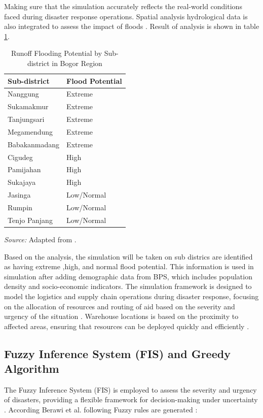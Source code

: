 \documentclass[journal,final,a4paper,twoside,11pt]{IEEEtran}
\begin{document}
Making sure that the simulation accurately reflects the real-world conditions faced during disaster response operations. Spatial analysis hydrological data is also integrated to assess the impact of floods \cite{alkaesi2021spatial}. Result of analysis is shown in table \ref{tab:analysis}.
\begin{table}[htbp]
\caption{Runoff Flooding Potential by Sub-district in Bogor Region}
\begin{center}
\begin{tabular}{|m{2.5cm}|m{2cm}|}
\hline
\textbf{Sub-district} & \textbf{Flood Potential} \\
\hline
Nanggung & Extreme \\
\hline Sukamakmur & Extreme \\
\hline Tanjungsari & Extreme \\
\hline Megamendung & Extreme  \\
\hline Babakanmadang & Extreme  \\
\hline
Cigudeg & High \\
\hline Pamijahan & High  \\
\hline Sukajaya & High  \\
\hline
Jasinga & Low/Normal  \\
\hline Rumpin & Low/Normal  \\
\hline Tenjo Panjang & Low/Normal  \\
\hline
\end{tabular}
\vspace{0.2cm}

\footnotesize{\textit{Source:} Adapted from \cite{alkaesi2021spatial}.}
\label{tab:analysis}
\end{center}
\end{table}

Based on the analysis, the simulation will be taken on sub districs are identified as having extreme ,high, and normal flood potential. This information is used in simulation after adding demographic data from BPS, which includes population density and socio-economic indicators. The simulation framework is designed to model the logistics and supply chain operations during disaster response, focusing on the allocation of resources and routing of aid based on the severity and urgency of the situation \cite{park2021architectural}. Warehouse locations is based on the proximity to affected areas, ensuring that resources can be deployed quickly and efficiently \cite{halawa2020introduction}.  

\subsection{Fuzzy Inference System (FIS) and Greedy Algorithm}
The Fuzzy Inference System (FIS) is employed to assess the severity and urgency of disasters, providing a flexible framework for decision-making under uncertainty \cite{berawi2020prioritized}. According Berawi et al. following Fuzzy rules are generated :
\end{document}
